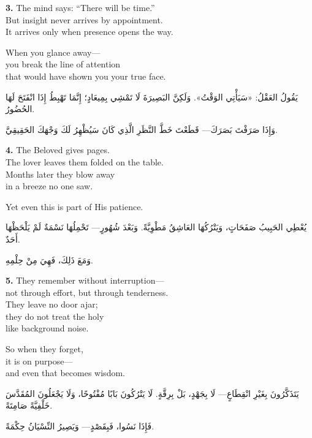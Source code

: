 \documentclass[11pt,a4paper,twoside]{book}
\begin{document}
\vspace{1em}
{\color{indigo}\bfseries 3.}\quad
The mind says: ``There will be time.''\\
But insight never arrives by appointment.\\
It arrives only when presence opens the way.

When you glance away—\\
you break the line of attention\\
that would have shown you your true face.

\begin{flushright}
{\arabicfont
يَقُولُ العَقْلُ: «سَيَأْتِي الوَقْتُ».
وَلَكِنَّ البَصِيرَةَ لَا تَمْشِي بِمِيعَادٍ؛
إِنَّمَا تَهْبِطُ
إِذَا انْفَتَحَ لَهَا الحُضُورُ.

وَإِذَا صَرَفْتَ بَصَرَكَ—
قَطَعْتَ خَطَّ النَّظَرِ
الَّذِي كَانَ سَيُظْهِرُ لَكَ وَجْهَكَ الحَقِيقِيَّ.}
\end{flushright}

\vspace{1em}
{\color{indigo}\bfseries 4.}\quad
The Beloved gives pages.\\
The lover leaves them folded on the table.\\
Months later they blow away\\
in a breeze no one saw.

Yet even this is part of His patience.

\begin{flushright}
{\arabicfont
يُعْطِي الحَبِيبُ صَفَحَاتٍ،
وَيَتْرُكُهَا العَاشِقُ مَطْوِيَّةً.
وَبَعْدَ شُهُورٍ—
تَحْمِلُهَا نَسْمَةٌ لَمْ يَلْحَظْهَا أَحَدٌ.

وَمَعَ ذَلِكَ، فَهِيَ مِنْ حِلْمِهِ.}
\end{flushright}

\vspace{1em}
{\color{indigo}\bfseries 5.}\quad
They remember without interruption—\\
not through effort, but through tenderness.\\
They leave no door ajar;\\
they do not treat the holy\\
like background noise.

So when they forget,\\
it is on purpose—\\
and even that becomes wisdom.

\begin{flushright}
{\arabicfont
يَتَذَكَّرُونَ بِغَيْرِ انْقِطَاعٍ—
لَا بِجَهْدٍ، بَلْ بِرِقَّةٍ.
لَا يَتْرُكُونَ بَابًا مُفْتُوحًا،
وَلَا يَجْعَلُونَ المُقَدَّسَ
خَلْفِيَّةً صَامِتَةً.

فَإِذَا نَسُوا،
فَبِقَصْدٍ—
وَيَصِيرُ النِّسْيَانُ حِكْمَةً.}
\end{flushright}
\end{document}
